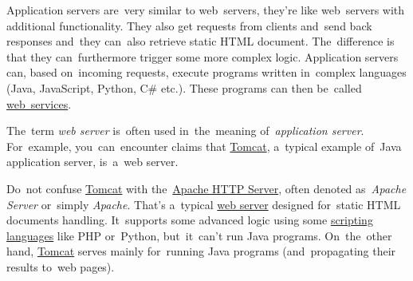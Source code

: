 \label{applicationserver}
Application servers are~very similar to web~servers, they're like web~servers with additional functionality. They also get requests from clients and~send back responses and~they can~also retrieve static HTML document. The~difference is that they can~furthermore trigger some more complex logic. Application servers can, based on~incoming requests, execute programs written in~complex languages (Java, JavaScript, Python, C\# etc.). These programs can then be~called \hyperref[webserviceapplication]{web~services}.

\warning The~term \textit{web server} is~often used in~the~meaning of~\textit{application server}. For~example, you~can~encounter claims that \hyperref[tomcat]{Tomcat}, a~typical example of~Java application server, is~a~web server.

\warning Do~not confuse \hyperref[tomcat]{Tomcat} with the~\href{https://en.wikipedia.org/wiki/Apache_HTTP_Server}{Apache HTTP Server}, often denoted as~\textit{Apache Server} or~simply \textit{Apache}. That's a~typical \hyperref[webserver]{web server} designed for~static HTML documents handling. It~supports some advanced logic using some \hyperref[scriptinglanguages]{scripting languages} like PHP or~Python, but~it~can't run Java programs. On~the~other hand, \hyperref[tomcat]{Tomcat} serves mainly for~running Java programs (and~propagating their results to~web pages).

\label{dns}
